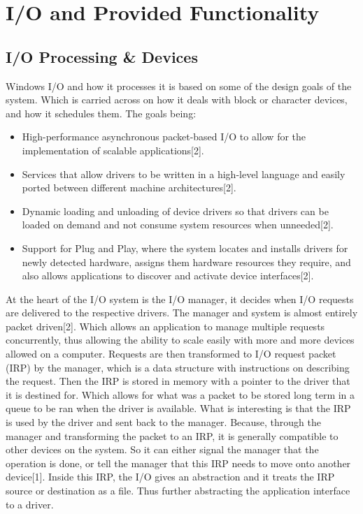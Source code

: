 \documentclass{article}
\begin{document}
\section{I/O and Provided Functionality}
\subsection{ I/O Processing \& Devices}
    Windows I/O and how it processes it is based on some of the design goals of the system. Which is carried across on how it deals with block or character devices, and how it schedules them. The goals being:

    \begin{itemize}
        \item High-performance asynchronous packet-based I/O to allow for the implementation of scalable applications[2].
        \item Services that allow drivers to be written in a high-level language and easily ported between different machine architectures[2].
        \item Dynamic loading and unloading of device drivers so that drivers can be loaded on demand and not consume system resources when unneeded[2].
        \item Support for Plug and Play, where the system locates and installs drivers for newly detected hardware, assigns them hardware resources they require, and also allows applications to discover and activate device interfaces[2].

    \end{itemize}


    At the heart of the I/O system is the I/O manager, it decides when I/O requests are delivered to the respective drivers. The manager and system is almost entirely packet driven[2]. Which allows an application to manage multiple requests concurrently, thus allowing the ability to scale easily with more and more devices allowed on a computer. Requests are then transformed to I/O request packet (IRP)  by the manager, which is a data structure with instructions on describing the request. Then the IRP is stored in memory with a pointer to the driver that it is destined for. Which allows for what was a packet to be stored long term in a queue to be ran when the driver is available. What is interesting is that the IRP is used by the driver and sent back to the manager. Because, through the manager and transforming the packet to an IRP, it is generally compatible to other devices on the system. So it can either signal the manager that the operation is done, or tell the  manager that this IRP needs to move onto another device[1]. Inside this IRP, the I/O gives an abstraction and it treats the IRP source or destination as a file. Thus further abstracting the application interface to a driver.
\end{document}
